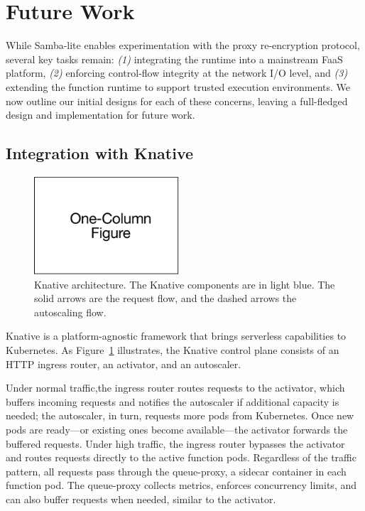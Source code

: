 \section{Future Work}
\label{sec:future}

While Samba-lite enables experimentation with the proxy re-encryption protocol,
several key tasks remain: \emph{(1)} integrating the runtime into a mainstream
FaaS platform, \emph{(2)} enforcing control-flow integrity at the network I/O
level, and \emph{(3)} extending the function runtime to support trusted
execution environments.
%
We now outline our initial designs for each of these concerns, leaving a
full-fledged design and implementation for future work.


\subsection{Integration with Knative}

\begin{figure}
    \centering
    \includegraphics[page = 6, width=0.48\textwidth]{diagrams/slides.pdf}
    \caption{Knative architecture.
    The Knative components are in light blue.
    The solid arrows are the request flow, and the dashed arrows the
    autoscaling flow.}
    \label{fig:knative}
\end{figure}

%
%
Knative is a platform-agnostic framework that brings serverless capabilities to
Kubernetes.
%
As Figure~\ref{fig:knative} illustrates, the Knative control plane
consists of an HTTP ingress router, an activator, and an autoscaler.


Under normal traffic,the ingress router routes requests to the activator, which
buffers incoming requests and notifies the autoscaler if additional capacity is
needed; the autoscaler, in turn, requests more pods from Kubernetes.
%
Once new pods are ready---or existing ones become available---the activator
forwards the buffered requests.
%
Under high traffic, the ingress router bypasses the activator and routes
requests directly to the active function pods.
%
Regardless of the traffic pattern, all requests pass through the queue-proxy, a
sidecar container in each function pod.
%
The queue-proxy collects metrics, enforces concurrency limits, and can also
buffer requests when needed, similar to the activator.


